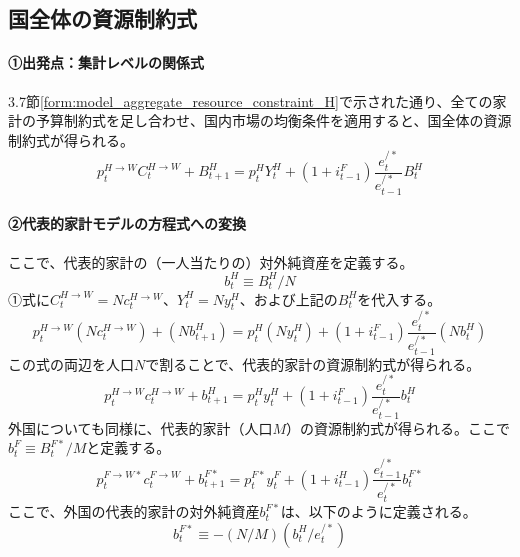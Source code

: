 \subsection{国全体の資源制約式}
\label{sec:model_final_equations_resource}
\paragraph{①出発点：集計レベルの関係式}\label{sec:model_final_equations_resource_origin}
3.7節\eqref{form:model_aggregate_resource_constraint_H}で示された通り、全ての家計の予算制約式を足し合わせ、国内市場の均衡条件を適用すると、国全体の資源制約式が得られる。
\begin{equation}
p_t^{H\to W}C_t^{H\to W}+B_{t+1}^H=p_t^HY_t^H+(1+i_{t-1}^F)\frac{e_t^{/*}}{e_{t-1}^{/*}}B_t^H
\label{form:model_final_equations_resource_agg_restated}
\end{equation}

\paragraph{②代表的家計モデルの方程式への変換}\label{sec:model_final_equations_resource_ra_eq}
ここで、代表的家計の（一人当たりの）対外純資産を定義する。
\begin{equation}
b_t^H\equiv B_t^H/N
\label{form:model_final_equations_resource_ra_b_h_def}
\end{equation}
①式に\(C_t^{H\to W}=Nc_t^{H\to W}\)、\(Y_t^H=Ny_t^H\)、および上記の\(B_t^H\)を代入する。
\begin{equation}
p_t^{H\to W}(Nc_t^{H\to W})+(Nb_{t+1}^H)=p_t^H(Ny_t^H)+(1+i_{t-1}^F)\frac{e_t^{/*}}{e_{t-1}^{/*}}(Nb_t^H)
\label{form:model_final_equations_resource_derivation}
\end{equation}
この式の両辺を人口\(N\)で割ることで、代表的家計の資源制約式が得られる。
\begin{equation}
p_t^{H\to W}c_t^{H\to W}+b_{t+1}^H=p_t^Hy_t^H+(1+i_{t-1}^F)\frac{e_t^{/*}}{e_{t-1}^{/*}}b_t^H
\label{form:model_final_equations_resource_h}
\end{equation}
外国についても同様に、代表的家計（人口\(M\)）の資源制約式が得られる。ここで\(b_t^F\equiv B_t^{F*}/M\)と定義する。
\begin{equation}
p_t^{F\to W*}c_t^{F\to W}+b_{t+1}^{F*}=p_t^{F*}y_t^F+(1+i_{t-1}^H)\frac{e_{t-1}^{/*}}{e_t^{/*}}b_t^{F*}
\label{form:model_final_equations_resource_f}
\end{equation}
ここで、外国の代表的家計の対外純資産\(b_t^{F*}\)は、以下のように定義される。
\begin{equation}
b_t^{F*}\equiv-(N/M)(b_t^H/e_t^{/*})
\label{form:model_final_equations_resource_ra_b_f_def}
\end{equation}

